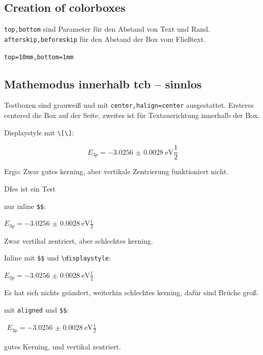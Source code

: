 
\subsection{Creation of colorboxes}
\verb|top,bottom| sind Parameter für den Abstand von Text und Rand. \verb|afterskip,beforeskip| für den Abstand der Box vom Fließtext.
\begin{rb}
  \verb|top=10mm,bottom=1mm|
\end{rb}

\subsection{Mathemodus innerhalb tcb -- sinnlos}

Testboxen sind grauweiß und mit \verb|center,halign=center| ausgestattet. Ersteres centered die Box auf der Seite, zweites ist für Textausrichtung innerhalb der Box.

Displaystyle mit \verb|\[\]|:
\begin{testbox}
  \[E_{3p}=\qty{-3.0256(28)}{\electronvolt}\frac12\]
\end{testbox}
Ergo: Zwar gutes kerning, aber vertikale Zentrierung funktioniert nicht. 
\begin{testbox}
  DIes ist ein Test
\end{testbox}

nur inline \verb|$$|:
\begin{testbox}
  $E_{3p}=\qty{-3.0256(28)}{\electronvolt}\frac12$
\end{testbox}
Zwar vertikal zentriert, aber schlechtes kerning.

Inline mit \verb|$$| und \verb|\displaystyle|:
\begin{testbox}
  $\displaystyle
  E_{3p}=\qty{-3.0256(28)}{\electronvolt}\frac12$
\end{testbox}
Es hat sich nichts geändert, weiterhin schlechtes kerning, dafür sind Brüche groß.

mit \verb|aligned| und \verb|$$|:
\begin{testbox}
  $\begin{aligned}
  E_{3p}=\qty{-3.0256(28)}{\electronvolt}\frac12
    \end{aligned}$
\end{testbox}
gutes Kerning, und vertikal zentriert. 

